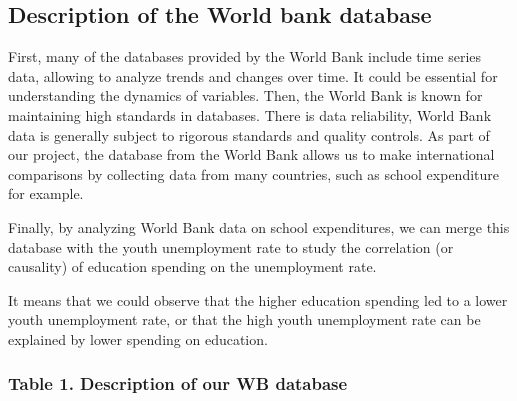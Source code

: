 \documentclass[
  letterpaper,
  DIV=11,
  numbers=noendperiod]{scrartcl}
\begin{document}
\hypertarget{description-of-the-world-bank-database}{%
\subsection{Description of the World bank
database}\label{description-of-the-world-bank-database}}

First, many of the databases provided by the World Bank include time
series data, allowing to analyze trends and changes over time. It could
be essential for understanding the dynamics of variables. Then, the
World Bank is known for maintaining high standards in databases. There
is data reliability, World Bank data is generally subject to rigorous
standards and quality controls. As part of our project, the database
from the World Bank allows us to make international comparisons by
collecting data from many countries, such as school expenditure for
example.

Finally, by analyzing World Bank data on school expenditures, we can
merge this database with the youth unemployment rate to study the
correlation (or causality) of education spending on the unemployment
rate.

It means that we could observe that the higher education spending led to
a lower youth unemployment rate, or that the high youth unemployment
rate can be explained by lower spending on education.

\hypertarget{table-1.-description-of-our-wb-database}{%
\subsubsection{Table 1. Description of our WB
database}\label{table-1.-description-of-our-wb-database}}
\end{document}

